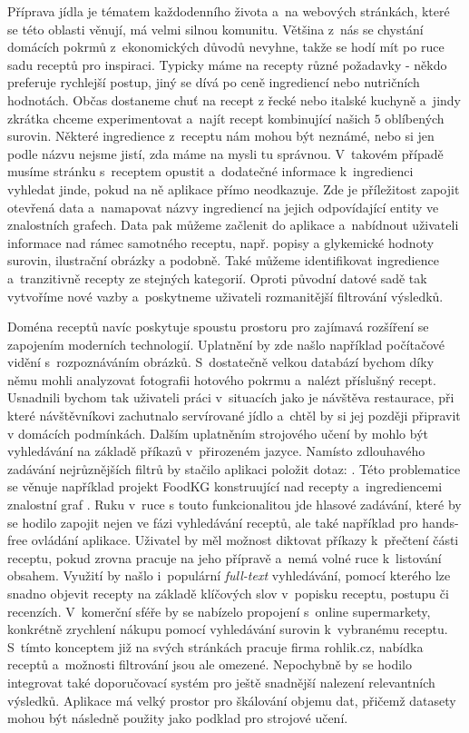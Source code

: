 Příprava jídla je tématem každodenního života a~na webových stránkách, které se této oblasti věnují, má velmi silnou komunitu. Většina z~nás se chystání domácích pokrmů z~ekonomických důvodů nevyhne, takže se hodí mít po ruce sadu receptů pro inspiraci. Typicky máme na recepty různé požadavky - někdo preferuje rychlejší postup, jiný se dívá po ceně ingrediencí nebo nutričních hodnotách. Občas dostaneme chuť na recept z řecké nebo italské kuchyně a~jindy zkrátka chceme experimentovat a~najít recept kombinující našich $5$ oblíbených surovin. Některé ingredience z~receptu nám mohou být neznámé, nebo si jen podle názvu nejsme jistí, zda máme na mysli tu správnou. V~takovém případě musíme stránku s~receptem opustit a~dodatečné informace k~ingredienci vyhledat jinde, pokud na ně aplikace přímo neodkazuje. Zde je příležitost zapojit otevřená data a~namapovat názvy ingrediencí na jejich odpovídající entity ve znalostních grafech. Data pak můžeme začlenit do aplikace a~nabídnout uživateli informace nad rámec samotného receptu, např. popisy a glykemické hodnoty surovin, ilustrační obrázky a podobně. Také můžeme identifikovat ingredience a~tranzitivně recepty ze stejných kategorií. Oproti původní datové sadě tak vytvoříme nové vazby a~poskytneme uživateli rozmanitější filtrování výsledků.

Doména receptů navíc poskytuje spoustu prostoru pro zajímavá rozšíření se zapojením moderních technologií. Uplatnění by zde našlo například počítačové vidění s~rozpoznáváním obrázků. S~dostatečně velkou databází bychom díky němu mohli analyzovat fotografii hotového pokrmu a~nalézt příslušný recept. Usnadnili bychom tak uživateli práci v~situacích jako je návštěva restaurace, při které návštěvníkovi zachutnalo servírované jídlo a~chtěl by si jej později připravit v domácích podmínkách. Dalším uplatněním strojového učení by mohlo být vyhledávání na základě příkazů v~přirozeném jazyce. Namísto zdlouhavého zadávání nejrůznějších filtrů by stačilo aplikaci položit dotaz: . Této problematice se věnuje například projekt FoodKG konstruující nad recepty a~ingrediencemi znalostní graf \citep{food-kg}. Ruku v~ruce s touto funkcionalitou jde hlasové zadávání, které by se hodilo zapojit nejen ve fázi vyhledávání receptů, ale také například pro hands-free ovládání aplikace. Uživatel by měl možnost diktovat příkazy k~přečtení části receptu, pokud zrovna pracuje na jeho přípravě a~nemá volné ruce k~listování obsahem. Využití by našlo i~populární \emph{full-text} vyhledávání, pomocí kterého lze snadno objevit recepty na základě klíčových slov v~popisku receptu, postupu či recenzích. V~komerční sféře by se nabízelo propojení s~online supermarkety, konkrétně zrychlení nákupu pomocí vyhledávání surovin k~vybranému receptu. S~tímto konceptem již na svých stránkách pracuje firma rohlik.cz, nabídka receptů a~možnosti filtrování jsou ale omezené. Nepochybně by se hodilo integrovat také doporučovací systém pro ještě snadnější nalezení relevantních výsledků. Aplikace má velký prostor pro škálování objemu dat, přičemž datasety mohou být následně použity jako podklad pro strojové učení.
